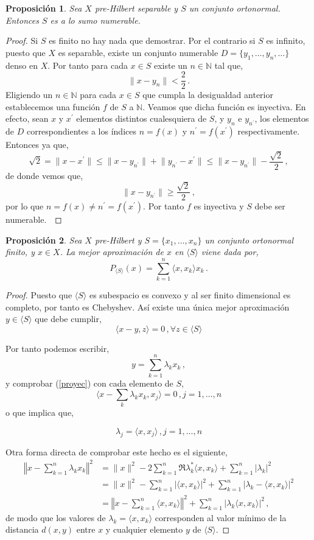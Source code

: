 \documentclass[12pt]{book}
\newtheorem{prop}{\bf Proposición}[chapter]
\def\NN{\mathbb{N}}
\newcommand{\abs}[1]{\lvert #1\rvert }
\newcommand{\norm}[1]{\lVert #1\rVert }
\newcommand{\lin}[1]{\langle #1 \rangle}
\newcommand{\Abs}[1]{\left\vert #1\right\vert}
\newcommand{\Norm}[1]{\left\Vert #1\right\Vert }
\begin{document}
\begin{prop} Sea $X$  pre-Hilbert separable y $S$ un conjunto ortonormal. Entonces $S$ es a lo sumo numerable.
\end{prop}
\begin{proof}
Si $S$ es finito no hay nada que demostrar. Por el contrario si $S$ es infinito, puesto que  $X$ es separable, existe un conjunto numerable $D=\{y_1,\dots,y_n,\dots\}$ denso en $X$. Por tanto para cada $x\in S$ existe un $n\in \NN$ tal que,
$$\norm{x-y_n}<\frac{2}{2}\,.$$
Eligiendo un $n\in \NN$ para cada $x\in S$ que cumpla la desigualdad anterior establecemos una función $f$ de $S$ a $\NN$. Veamos que dicha función es inyectiva. En efecto, sean $x$  y $x^\prime$ elementos distintos cualesquiera  de $S$, y $y_n$ e $y_{n^\prime}$, los elementos de $D$ correspondientes a los índices $n=f(x)$ y $n^\prime=f(x^\prime)$ respectivamente. Entonces ya que,
$$\sqrt{2}=\norm{x-x^\prime}\leq \norm{x-y_{n^\prime}}+ \norm{y_{n^\prime}-x^\prime}\leq \norm{x-y_{n^\prime}} -\frac{\sqrt{2}}{2}\,,$$
de donde vemos que,
$$\norm{x-y_{n^\prime}}\geq \frac{\sqrt{2}}{2}\,,$$
por lo que $n=f(x)\not= n^\prime=f(x^\prime)$. Por tanto $f$  es inyectiva y $S$ debe ser numerable.\
\end{proof}

\begin{prop} Sea $X$  pre-Hilbert y $S=\{x_1,\dots,x_n\}$  un conjunto ortonormal finito, y $x\in X$. La mejor aproximación de $x$  en $\lin{S}$ viene dada por,
$$P_{\lin{S}}(x)=\sum_{k=1}^n  \lin{x, x_k} x_k\,.$$
\end{prop}
\begin{proof}
Puesto que $\lin{S}$ es subespacio es convexo y al ser  finito dimensional es completo, por tanto es Chebyshev. Así existe una única  mejor aproximación $y\in \lin{S}$ que debe cumplir,
\begin{equation}
\lin{ x-y,z}=0\,,\forall z\in \lin{S}\label{proyec}
\end{equation}

Por  tanto podemos escribir,
$$y=\sum_{k=1}^n \lambda_k x_k\,,$$
y comprobar (\ref{proyec}) con cada elemento de $S$,
$$\lin{x-\sum_k \lambda_k x_k,x_j}=0\,,j=1,\dots,n$$
o que implica que,
 
 $$\lambda_j=\lin{x,x_j}\,, j=1,\dots,n$$
 

Otra forma directa de comprobar este hecho  es el  siguiente,
\begin{align}
\Norm{x-\sum_{k=1}^n\lambda_k x_k}^2&= \norm{x}^2 -2\sum_{k=1}^n\Re \lambda_k^*\lin{x,x_k}+\sum_{k=1}^n \abs{\lambda_k}^2\nonumber\\
&=\norm{x}^2 -\sum_{k=1}^n\Abs{\lin{x,x_k}}^2 +\sum_{k=1}^n \Abs{\lambda_k-\lin{x,x_k}}^2 \nonumber\\
&=\Norm{x-\sum_{k=1}^n \lin{x,x_k}}^2+\sum_{k=1}^n\Abs{\lambda_k\lin{x,x_k}}^2\,, \label{descomposicion}
\end{align}
de modo que los valores de $\lambda_k=\lin{x,x_k}$ corresponden al valor mínimo de la distancia $d(x,y)$ entre $x$ y cualquier elemento $y$ de $\lin{S}$.
\end{proof}
\end{document}
